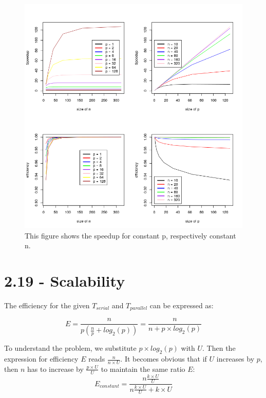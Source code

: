 \documentclass[a4paper,11pt,twoside]{article}
\begin{document}
\begin{figure}
  
  \centering
    \includegraphics[width=1\textwidth]{speedup.png}
    \caption{This figure shows the speedup for constant p, respectively constant n.}
    \label{fig:speedup}
\end{figure}

\section{2.19 - Scalability}
The efficiency for the given $T_{serial}$ and $T_{parallel}$ can be expressed as:

\begin{equation*}
E = \frac{n}{p (\frac{n}{p} + log_{2}(p))} = \frac{n}{n + p \times log_{2}(p)}   
\end{equation*}

To understand the problem, we substitute $p \times log_{2}(p)$ with $U$. Then the expression for efficiency $E$ reads $\frac{n}{n \times U}$. It becomes obvious that if $U$ increases by $p$, then $n$ has to increase by $\frac{p \times U}{U}$ to maintain the same ratio $E$:
\begin{equation*}
E_{constant} = \frac{n \frac{k \times U}{U}}{n \frac{k \times U}{U} + {k \times U}}
\end{equation*}
\end{document}
